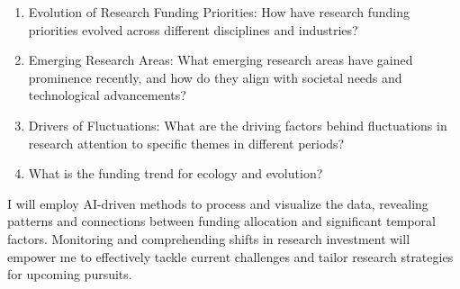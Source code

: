 \begin{enumerate}
  \item Evolution of Research Funding Priorities: How have research funding priorities evolved across different disciplines and industries? 
  \item Emerging Research Areas: What emerging research areas have gained prominence recently, and how do they align with societal needs and technological advancements?
  \item Drivers of Fluctuations: What are the driving factors behind fluctuations in research attention to specific themes in different periods?\\
  \item What is the funding trend for ecology and evolution?\\
 
\end{enumerate}

I will employ AI-driven methods to process and visualize the data, revealing patterns and connections between funding allocation and significant temporal factors. Monitoring and comprehending shifts in research investment will empower me to effectively tackle current challenges and tailor research strategies for upcoming pursuits.\\